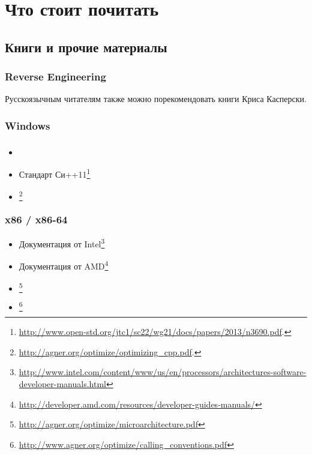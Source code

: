 \part{Что стоит почитать}

\chapter{Книги и прочие материалы}

\section{Reverse Engineering}



Русскоязычным читателям также можно порекомендовать книги Криса Касперски.

\section{Windows}



\section{\CCpp}

\section{\CCpp}

\begin{itemize}
\item \KRBook

\item Стандарт Си++11\footnote{\AlsoAvailableAs \url{http://www.open-std.org/jtc1/sc22/wg21/docs/papers/2013/n3690.pdf}.}

\item [\AgnerFogCCP]\footnote{\AlsoAvailableAs \url{http://agner.org/optimize/optimizing_cpp.pdf}.}
\end{itemize}

\section{x86 / x86-64}

\label{x86_manuals}
\begin{itemize}
\item Документация от Intel\footnote{\AlsoAvailableAs \url{http://www.intel.com/content/www/us/en/processors/architectures-software-developer-manuals.html}}

\item Документация от AMD\footnote{\AlsoAvailableAs \url{http://developer.amd.com/resources/developer-guides-manuals/}}

\item \AgnerFog{}\footnote{\AlsoAvailableAs \url{http://agner.org/optimize/microarchitecture.pdf}}

\item \AgnerFogCC{}\footnote{\AlsoAvailableAs \url{http://www.agner.org/optimize/calling_conventions.pdf}}
\end{itemize}

